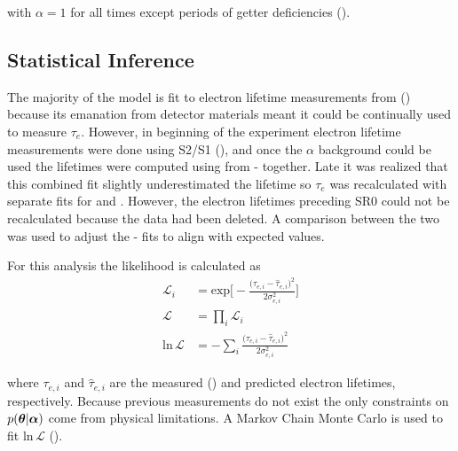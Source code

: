\vspace{-15pt}

\noindent with $\alpha = 1$ for all times except periods of getter deficiencies
().



\subsection{Statistical Inference}
\label{subsec:elifetime_fit_likelihood}
The majority of the model is fit to electron lifetime measurements from 
() because its emanation from
detector materials meant it could be continually used to measure $\tau_e$.  However, in beginning of the
experiment electron lifetime measurements were done using S2/S1 (), and once the $\alpha$
background could be used the lifetimes were computed using \alphadecays from - together.  Late it was realized
that this combined
fit slightly underestimated the lifetime so $\tau_e$ was recalculated with separate fits for  and .  However,
the electron lifetimes preceding SR0 could not be recalculated because the data had been deleted.  A comparison between the two was used
to adjust the - fits to align with expected values.

For this analysis the likelihood is calculated as
\vspace{-5pt}
\begin{subequations}
\begin{align}
\mathcal{L}_i &= \mathrm{exp} \Bigg[ -\frac{\big(\tau_{e, i} -
\hat{\tau}_{e, i} \big)^2}{2 \sigma_{e, i}^2} \Bigg]
\\[3pt]
\mathcal{L} &= \prod_i \mathcal{L}_i
\\[3pt]
\mathrm{ln}\, \mathcal{L} &= -\sum_i \frac{\big(\tau_{e, i} -
\hat{\tau}_{e, i} \big)^2}{2\sigma_{e, i}^2}
\end{align}
\label{eq:elifetime_fit_mcmc_de_snooker_projs}
\end{subequations}

\vspace{-25pt}

\noindent where $\tau_{e, i}$ and $\hat{\tau}_{e, i}$ are the measured () and predicted
electron lifetimes, respectively.  Because previous measurements do not exist the only constraints on $p(\boldsymbol{\theta}|\boldsymbol{\alpha})$
come from physical limitations.  A Markov Chain Monte Carlo is used to fit $\mathrm{ln}\, \mathcal{L}$
().



